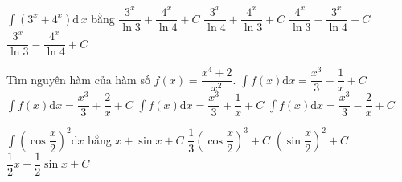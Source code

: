 \begin{ex}%
	$\displaystyle\int (3^x+4^x)\mathrm{d}\,x$ bằng
	\choice
	{\True  $\dfrac{3^x}{\ln 3}+\dfrac{4^x}{\ln 4}+C$}
	{$\dfrac{3^x}{\ln 4}+\dfrac{4^x}{\ln 3}+C$}
	{$\dfrac{4^x}{\ln 3}-\dfrac{3^x}{\ln 4}+C$}
	{$\dfrac{3^x}{\ln 3}-\dfrac{4^x}{\ln 4}+C$}
\end{ex}

\begin{ex}%
	Tìm nguyên hàm của hàm số $ f(x)=\dfrac{{x^4}+2}{x^2}$.
	\choice
	{$\displaystyle\int{f(x)\mathrm{d}x=}\dfrac{{x^3}}{3}-\dfrac{1}{x}+C$}
	{\True $\displaystyle\int{f(x)\mathrm{d}x=}\dfrac{{x^3}}{3}+\dfrac{2}{x}+C$}
	{$\displaystyle\int{f(x)\mathrm{d}x=}\dfrac{{x^3}}{3}+\dfrac{1}{x}+C$}
	{\True $\displaystyle\int{f(x)\mathrm{d}x=}\dfrac{{x^3}}{3}-\dfrac{2}{x}+C$}
\end{ex}

\begin{ex}%
	$\displaystyle \int \left(\cos \dfrac{x}{2} \right)^2 \mathrm{d}x$ bằng
	\choice
	{$x+\sin x+C$}
	{$\dfrac{1}{3}\left(\cos \dfrac{x}{2} \right)^3+C$}
	{$\left(\sin \dfrac{x}{2} \right)^2+C$}
	{\True $\dfrac{1}{2}x+ \dfrac{1}{2}\sin x+C$}
\end{ex}

